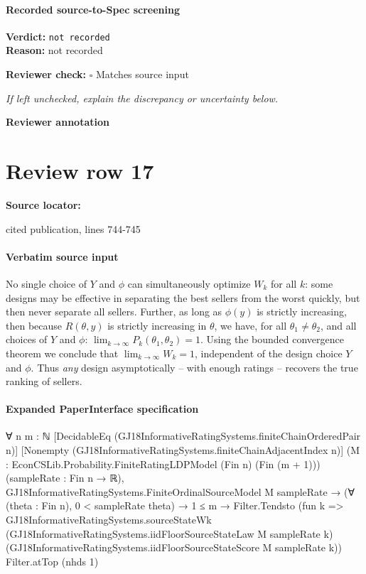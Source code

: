 \documentclass[10pt]{article}
\newcommand{\reviewerbox}{%
  \par\noindent\fbox{\parbox{0.96\linewidth}{\rule{0pt}{0.38in}}}\par
}
\newcommand{\reviewmatch}[1]{%
  \par\noindent\textbf{Reviewer check:} $\square$\; #1\par
  \noindent\emph{If left unchecked, explain the discrepancy or uncertainty below.}\par
}
\begin{document}
\paragraph{Recorded source-to-Spec screening}
\textbf{Verdict:} \texttt{not recorded}
\\
\textbf{Reason:} not recorded
\reviewmatch{Matches source input}
\noindent\textbf{Reviewer annotation}\par
\reviewerbox
\clearpage
\hypertarget{source-claim-9ac3f4efe388ea2a}{}
\section*{Review row 17}
\textbf{Source locator:} {\footnotesize\raggedright cited publication, lines 744-\allowbreak{}745\par}
\paragraph{Verbatim source input}
\begin{ReviewVerbatim}
No single choice of $Y$ and $\phi$ can simultaneously optimize $W_k$ for all $k$: some designs may be effective in separating the best sellers from the worst quickly, but then never separate all sellers. Further, as long as $\phi(y)$ is strictly increasing, then because $R(\theta, y)$ is strictly increasing in $\theta$, we have, for all $\theta_1\neq \theta_2$, and all choices of $Y$ and $\phi$:
$\lim_{k \to \infty} P_k(\theta_1, \theta_2) = 1$. Using the bounded convergence theorem we conclude that $\lim_{k \to \infty} W_k = 1 $, independent of the design choice $Y$ and $\phi$.  Thus {\em any} design asymptotically  -- with enough ratings -- recovers the true ranking of sellers.
\end{ReviewVerbatim}


\paragraph{Expanded PaperInterface specification}
\begin{ReviewVerbatim}
∀ {n m : ℕ} [DecidableEq (GJ18InformativeRatingSystems.finiteChainOrderedPair n)]
  [Nonempty (GJ18InformativeRatingSystems.finiteChainAdjacentIndex n)]
  (M : EconCSLib.Probability.FiniteRatingLDPModel (Fin n) (Fin (m + 1))) (sampleRate : Fin n → ℝ),
  GJ18InformativeRatingSystems.FiniteOrdinalSourceModel M sampleRate →
    (∀ (theta : Fin n), 0 < sampleRate theta) →
      1 ≤ m →
        Filter.Tendsto
          (fun k =>
            GJ18InformativeRatingSystems.sourceStateWk
              (GJ18InformativeRatingSystems.iidFloorSourceStateLaw M sampleRate k)
              (GJ18InformativeRatingSystems.iidFloorSourceStateScore M sampleRate k))
          Filter.atTop (nhds 1)
\end{ReviewVerbatim}
\end{document}
